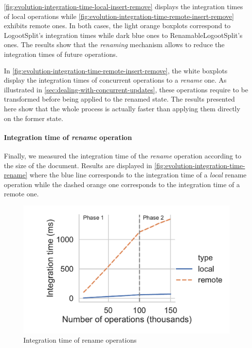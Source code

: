 \documentclass[sigplan,10pt]{acmart}
\begin{document}
\autoref{fig:evolution-integration-time-local-insert-remove} displays the integration times of local operations while \autoref{fig:evolution-integration-time-remote-insert-remove} exhibits remote ones.
In both cases, the light orange boxplots correspond to LogootSplit's integration times while dark blue ones to RenamableLogootSplit's ones.
The results show that the \emph{renaming} mechanism allows to reduce the integration times of future operations.

In \autoref{fig:evolution-integration-time-remote-insert-remove}, the white boxplots display the integration times of concurrent operations to a \emph{rename} one.
As illustrated in \autoref{sec:dealing-with-concurrent-updates}, these operations require to be transformed before being applied to the renamed state.
The results presented here show that the whole process is actually faster than applying them directly on the former state.

\paragraph{Integration time of \emph{rename} operation}

Finally, we measured the integration time of the \emph{rename} operation according to the size of the document.
Results are displayed in \autoref{fig:evolution-integration-time-rename} where the blue line corresponds to the integration time of a \emph{local} rename operation while the dashed orange one corresponds to the integration time of a remote one.

\begin{figure}[ht!]
    \centering
    \includegraphics[width=0.9\columnwidth]{img/integration-time-rename.pdf}
    \caption{Integration time of rename operations}
    \label{fig:evolution-integration-time-rename}
\end{figure}
\end{document}
